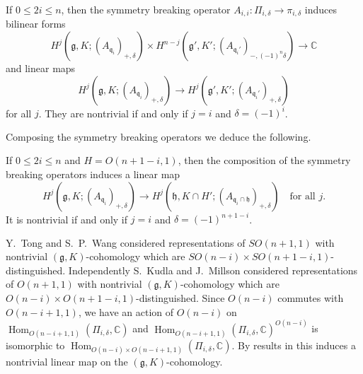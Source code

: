 \begin{corollary}
\label{cor:12.14}
If  $0 \le 2i \le n$, 
 then the symmetry breaking operator $A_{i,i}\colon \Pi_{i,\delta} \to \pi_{i,\delta}$
 induces bilinear forms
\[
   H^j({\mathfrak{g}}, K; (A_{{\mathfrak{q}}_i})_{+,\delta})
  \times   
   H^{n-j}({\mathfrak{g}}', K'; (A_{{\mathfrak{q}}_i'})_{-,(-1)^n\delta})
  \to {\mathbb{C}}
\]
and linear maps
\[
  H^j({\mathfrak{g}}, K; (A_{{\mathfrak{q}}_i})_{+,\delta})
  \to  
   H^{j}({\mathfrak{g}}', K'; (A_{{\mathfrak{q}}_i'})_{+,\delta})
\]
for all $j$. 
They are nontrivial if and only if $j=i$ and $\delta=(-1)^i$.
\end{corollary}


Composing the symmetry breaking operators we deduce the following.  

\begin{corollary}
\label{cor:12.14.com}
If $0 \le 2i \le n$ and $H=O(n+1-i,1)$, 
 then the composition of the symmetry  breaking operators
 induces a linear map
\[
  H^{j}({\mathfrak{g}}, K; (A_{{\mathfrak{q}}_i})_{+,\delta})
  \to  
   H^{j}({\mathfrak{h}}, K\cap H';  (A_{{\mathfrak{q}}_i \cap \mathfrak{h}})_{+,\delta})
 \quad \text{for all } j. 
\]
It is nontrivial if and only if $j=i$ and $\delta=(-1)^{n+1-i}$.  
\end{corollary}


\begin{remark}
\label{rem:TongWang}
Y.~Tong and S.~P.~Wang \cite{TW} considered representations of $SO(n+1,1)$
 with nontrivial $({\mathfrak{g}},K)$-cohomology which are  $SO(n-i) \times SO(n+1-i,1)$-distinguished. Independently 
  S.~Kudla and J.~Millson \cite{KM2}
 considered representations
 of $O(n+1,1)$ with nontrivial $({\mathfrak{g}},K)$-cohomology
 which are  $O(n-i) \times O(n+1-i,1)$-distinguished. 
Since $O(n-i)$ commutes with $O(n-i+1,1)$,
 we have an action of $O(n-i)$
 on ${\operatorname{Hom}}_{O(n-i+1,1)}(\Pi_{i,\delta},{\mathbb C})$
 and ${\operatorname{Hom}}_{O(n-i+1,1)}(\Pi_{i,\delta},{\mathbb C})^{O(n-i)}$
 is isomorphic to ${\operatorname{Hom}}_{O(n-i)\times O(n-i+1,1)}(\Pi_{i,\delta},{\mathbb C})$.
 By results in \cite{KM2} this induces a nontrivial linear map
 on the $({\mathfrak{g}},K)$-cohomology.  
\end{remark}


